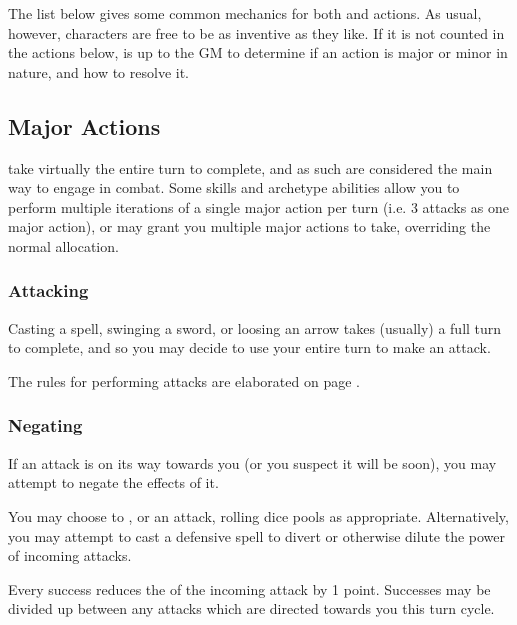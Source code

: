  The list below gives some common mechanics for both  and  actions. As usual, however, characters are free to be as inventive as they like. If it is not counted in the actions below, is up to the GM to determine if an action is major or minor in nature, and how to resolve it. 
 
 \subsection{Major Actions}
 
  take virtually the entire turn to complete, and as such are considered the main way to engage in combat. Some skills and archetype abilities allow you to perform multiple iterations of a single major action per turn (i.e. 3 attacks as one major action), or may grant you multiple major actions to take, overriding the normal allocation. 
 
 \subsubsection{Attacking}
 
 Casting a spell, swinging a sword, or loosing an arrow takes (usually) a full turn to complete, and so you may decide to use your entire turn to make an attack.
 
The rules for performing attacks are elaborated on page \pageref{S:Attacks}.


	\subsubsection{Negating}    
	
	If an attack is on its way towards you (or you suspect it will be soon), you may attempt to negate the effects of it. 
	
	You may choose to ,  or  an attack, rolling dice pools as appropriate. Alternatively, you may attempt to cast a defensive spell to divert or otherwise dilute the power of incoming attacks. 
	
	Every success reduces the  of the incoming attack by 1 point. Successes may be divided up between any attacks which are directed towards you this turn cycle. 
	
